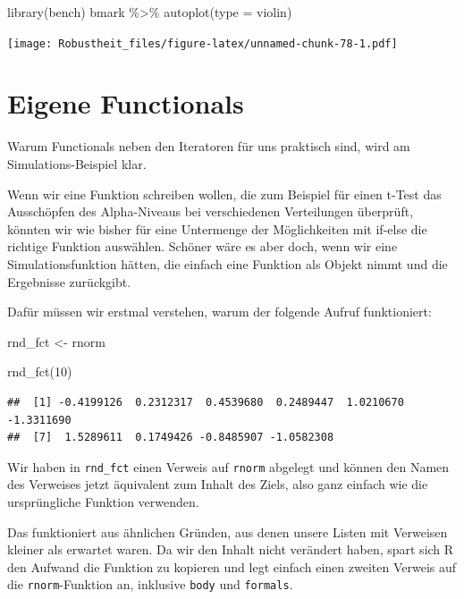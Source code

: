 \documentclass[
]{book}
\newenvironment{Shaded}{\begin{snugshade}}{\end{snugshade}}
\newcommand{\AttributeTok}[1]{\textcolor[rgb]{0.77,0.63,0.00}{#1}}
\newcommand{\DecValTok}[1]{\textcolor[rgb]{0.00,0.00,0.81}{#1}}
\newcommand{\FunctionTok}[1]{\textcolor[rgb]{0.00,0.00,0.00}{#1}}
\newcommand{\NormalTok}[1]{#1}
\newcommand{\OtherTok}[1]{\textcolor[rgb]{0.56,0.35,0.01}{#1}}
\newcommand{\SpecialCharTok}[1]{\textcolor[rgb]{0.00,0.00,0.00}{#1}}
\newcommand{\StringTok}[1]{\textcolor[rgb]{0.31,0.60,0.02}{#1}}
\begin{document}
\begin{Shaded}
\begin{Highlighting}[]
\FunctionTok{library}\NormalTok{(bench)}
\NormalTok{bmark }\SpecialCharTok{\%\textgreater{}\%} 
  \FunctionTok{autoplot}\NormalTok{(}\AttributeTok{type =} \StringTok{\textquotesingle{}violin\textquotesingle{}}\NormalTok{)}
\end{Highlighting}
\end{Shaded}

\texttt{[image: Robustheit\_files/figure-latex/unnamed-chunk-78-1.pdf]}

\hypertarget{eigene-functionals}{%
\section{Eigene Functionals}\label{eigene-functionals}}

Warum Functionals neben den Iteratoren für uns praktisch sind, wird am Simulations-Beispiel klar.

Wenn wir eine Funktion schreiben wollen, die zum Beispiel für einen t-Test das Ausschöpfen des Alpha-Niveaus bei verschiedenen Verteilungen überprüft, könnten wir wie bisher für eine Untermenge der Möglichkeiten mit if-else die richtige Funktion auswählen.
Schöner wäre es aber doch, wenn wir eine Simulationsfunktion hätten, die einfach eine Funktion als Objekt nimmt und die Ergebnisse zurückgibt.

Dafür müssen wir erstmal verstehen, warum der folgende Aufruf funktioniert:

\begin{Shaded}
\begin{Highlighting}[]
\NormalTok{rnd\_fct }\OtherTok{\textless{}{-}}\NormalTok{ rnorm}

\FunctionTok{rnd\_fct}\NormalTok{(}\DecValTok{10}\NormalTok{)}
\end{Highlighting}
\end{Shaded}

\begin{verbatim}
##  [1] -0.4199126  0.2312317  0.4539680  0.2489447  1.0210670 -1.3311690
##  [7]  1.5289611  0.1749426 -0.8485907 -1.0582308
\end{verbatim}

Wir haben in \texttt{rnd\_fct} einen Verweis auf \texttt{rnorm} abgelegt und können den Namen des Verweises jetzt äquivalent zum Inhalt des Ziels, also ganz einfach wie die ursprüngliche Funktion verwenden.

Das funktioniert aus ähnlichen Gründen, aus denen unsere Listen mit Verweisen kleiner als erwartet waren. Da wir den Inhalt nicht verändert haben, spart sich R den Aufwand die Funktion zu kopieren und legt einfach einen zweiten Verweis auf die \texttt{rnorm}-Funktion an, inklusive \texttt{body} und \texttt{formals}.
\end{document}
